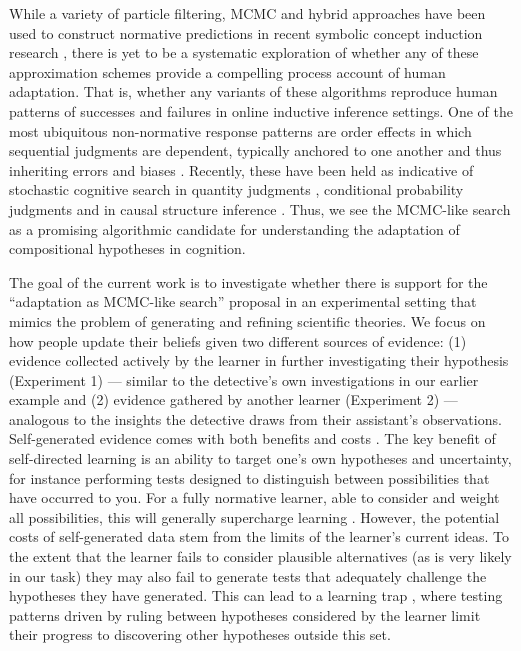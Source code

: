 \documentclass[doc,natbib,floatsintext]{apa7}
\begin{document}
While a variety of particle filtering, MCMC and hybrid approaches have been used to construct normative predictions in recent symbolic concept induction research \citep{goodman2008rational, piantadosi2016logical, yang2022one}, there is yet to be a systematic exploration of whether any of these approximation schemes provide a compelling process account of human adaptation. That is, whether any variants of these algorithms reproduce human patterns of successes and failures in online inductive inference settings. One of the most ubiquitous non-normative response patterns are order effects in which sequential judgments are dependent, typically anchored to one another and thus inheriting errors and biases \citep{hogarth1992order}. Recently, these have been held as indicative of stochastic cognitive search in quantity judgments \citep{lieder2018anchoring}, conditional probability judgments \citep{dasgupta2017hypotheses} and in causal structure inference \citep{bramley2017formalizing}. Thus, we see the MCMC-like search as a promising algorithmic candidate for understanding the adaptation of compositional hypotheses in cognition. 

The goal of the current work is to investigate whether there is support for the ``adaptation as MCMC-like search'' proposal in an experimental setting that mimics the problem of generating and refining scientific theories. We focus on how people update their beliefs given two different sources of evidence: (1) evidence collected actively by the learner in further investigating their hypothesis (Experiment 1) --- similar to the detective's own investigations in our earlier example and (2) evidence gathered by another learner (Experiment 2) --- analogous to the insights the detective draws from their assistant's observations. Self-generated evidence comes with both benefits and costs \citep{markant2014better}. The key benefit of self-directed learning is an ability to target one's own hypotheses and uncertainty, for instance performing tests designed to distinguish between possibilities that have occurred to you. For a fully normative learner, able to consider and weight all possibilities, this will generally supercharge learning \citep{markant2014better}. However, the potential costs of self-generated data stem from the limits of the learner's current ideas. To the extent that the learner fails to consider plausible alternatives (as is very likely in our task) they may also fail to generate tests that adequately challenge the hypotheses they have generated. This can lead to a learning trap \citep{rich2018limits,settles2009active}, where testing patterns driven by ruling between hypotheses considered by the learner limit their progress to discovering other hypotheses outside this set.
\end{document}
